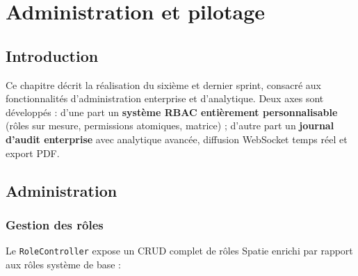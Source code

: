 \chapter{Administration et pilotage}

\section{Introduction}

Ce chapitre décrit la réalisation du sixième et dernier sprint, consacré aux
fonctionnalités d'administration enterprise et d'analytique. Deux axes sont
développés : d'une part un \textbf{système RBAC entièrement personnalisable}
(rôles sur mesure, permissions atomiques, matrice) ; d'autre part un \textbf{journal
d'audit enterprise} avec analytique avancée, diffusion WebSocket temps réel et
export PDF.

\section{Administration}

\subsection{Gestion des rôles}

Le \texttt{RoleController} expose un CRUD complet de rôles Spatie enrichi par
rapport aux rôles système de base :

